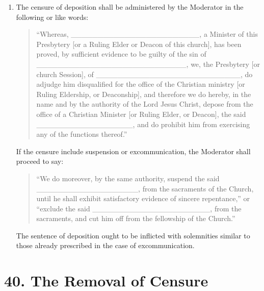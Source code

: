 \documentclass[
]{book}
\begin{document}
\begin{enumerate}
\def\labelenumi{\arabic{enumi}.}
\setcounter{enumi}{6}
\item
  The censure of deposition shall be administered by the Moderator in the following or like words:

  \begin{quote}
  ``Whereas, \_\_\_\_\_\_\_\_\_\_\_\_\_\_\_\_\_\_\_\_\_\_\_\_, a Minister of this Presbytery {[}or a Ruling Elder or Deacon of this church{]}, has been proved, by sufficient evidence to be guilty of the sin of \_\_\_\_\_\_\_\_\_\_\_\_\_\_\_\_\_\_\_\_\_\_\_\_\_\_\_\_, we, the Presbytery {[}or church Session{]}, of \_\_\_\_\_\_\_\_\_\_\_\_\_\_\_\_\_\_\_\_\_\_\_\_\_\_\_, do adjudge him disqualified for the office of the Christian ministry {[}or Ruling Eldership, or Deaconship{]}, and therefore we do hereby, in the name and by the authority of the Lord Jesus Christ, depose from the office of a Christian Minister {[}or Ruling Elder, or Deacon{]}, the said \_\_\_\_\_\_\_\_\_\_\_\_\_\_\_\_\_\_, and do prohibit him from exercising any of the functions thereof.''
  \end{quote}

  If the censure include suspension or excommunication, the Moderator shall proceed to say:

  \begin{quote}
  ``We do moreover, by the same authority, suspend the said \_\_\_\_\_\_\_\_\_\_\_\_\_\_\_\_\_\_\_, from the sacraments of the Church, until he shall exhibit satisfactory evidence of sincere repentance,'' or ``exclude the said \_\_\_\_\_\_\_\_\_\_\_\_\_\_\_\_\_\_\_\_\_\_, from the sacraments, and cut him off from the fellowship of the Church.''
  \end{quote}

  The sentence of deposition ought to be inflicted with solemnities similar to those already prescribed in the case of excommunication.
\end{enumerate}

\hypertarget{the-removal-of-censure}{%
\section*{40. The Removal of Censure}\label{the-removal-of-censure}}

\protect\hypertarget{chapter-slug-40-the-removal-of-censure}{\href{}{}}
\end{document}

